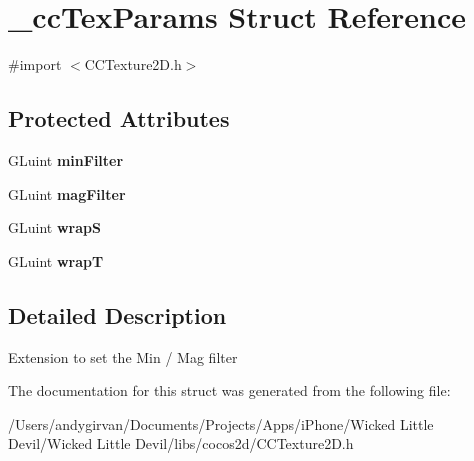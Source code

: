 \hypertarget{struct__cc_tex_params}{\section{\-\_\-cc\-Tex\-Params Struct Reference}
\label{struct__cc_tex_params}
}


{\ttfamily \#import $<$C\-C\-Texture2\-D.\-h$>$}

\subsection*{Protected Attributes}
\begin{DoxyCompactItemize}
\item 
\hypertarget{struct__cc_tex_params_a66ef303f14ef78c11d386d1ef5acf544}{G\-Luint {\bfseries min\-Filter}}\label{struct__cc_tex_params_a66ef303f14ef78c11d386d1ef5acf544}

\item 
\hypertarget{struct__cc_tex_params_a01d120824cbc059bfce37b7b1d38f613}{G\-Luint {\bfseries mag\-Filter}}\label{struct__cc_tex_params_a01d120824cbc059bfce37b7b1d38f613}

\item 
\hypertarget{struct__cc_tex_params_a937798619260278e5e27ab0f1a79e197}{G\-Luint {\bfseries wrap\-S}}\label{struct__cc_tex_params_a937798619260278e5e27ab0f1a79e197}

\item 
\hypertarget{struct__cc_tex_params_aef8621b667e793f737f09a3bf5c92480}{G\-Luint {\bfseries wrap\-T}}\label{struct__cc_tex_params_aef8621b667e793f737f09a3bf5c92480}

\end{DoxyCompactItemize}


\subsection{Detailed Description}
Extension to set the Min / Mag filter 

The documentation for this struct was generated from the following file\-:\begin{DoxyCompactItemize}
\item 
/\-Users/andygirvan/\-Documents/\-Projects/\-Apps/i\-Phone/\-Wicked Little Devil/\-Wicked Little Devil/libs/cocos2d/C\-C\-Texture2\-D.\-h\end{DoxyCompactItemize}

